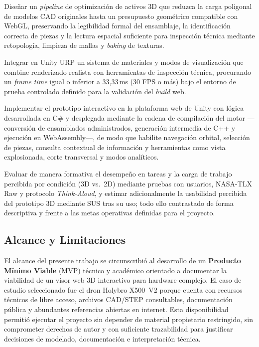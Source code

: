 Diseñar un \textit{pipeline} de optimización de activos 3D que reduzca la carga poligonal de modelos CAD originales hasta un presupuesto geométrico compatible con WebGL, preservando la legibilidad formal del ensamblaje, la identificación correcta de piezas y la lectura espacial suficiente para inspección técnica mediante retopología, limpieza de mallas y \textit{baking} de texturas.

Integrar en Unity URP un sistema de materiales y modos de visualización que combine renderizado realista con herramientas de inspección técnica, procurando un \textit{frame time} igual o inferior a 33,33\,ms (30 FPS o más) bajo el entorno de prueba controlado definido para la validación del \textit{build} web.

Implementar el prototipo interactivo en la plataforma web de Unity con lógica desarrollada en C\# y desplegada mediante la cadena de compilación del motor ---conversión de ensamblados administrados, generación intermedia de C++ y ejecución en WebAssembly---, de modo que habilite navegación orbital, selección de piezas, consulta contextual de información y herramientas como vista explosionada, corte transversal y modos analíticos.

Evaluar de manera formativa el desempeño en tareas y la carga de trabajo percibida por condición (3D vs.\ 2D) mediante pruebas con usuarios, NASA-TLX Raw y protocolo \textit{Think-Aloud}, y estimar adicionalmente la usabilidad percibida del prototipo 3D mediante SUS tras su uso; todo ello contrastado de forma descriptiva y frente a las metas operativas definidas para el proyecto.

\subsection{Alcance y Limitaciones}

El alcance del presente trabajo se circunscribió al desarrollo de un \textbf{Producto Mínimo Viable} (MVP) técnico y académico orientado a documentar la viabilidad de un visor web 3D interactivo para hardware complejo. El caso de estudio seleccionado fue el dron Holybro X500~V2 porque cuenta con recursos técnicos de libre acceso, archivos CAD/STEP consultables, documentación pública y abundantes referencias abiertas en internet. Esta disponibilidad permitió ejecutar el proyecto sin depender de material propietario restringido, sin comprometer derechos de autor y con suficiente trazabilidad para justificar decisiones de modelado, documentación e interpretación técnica.


